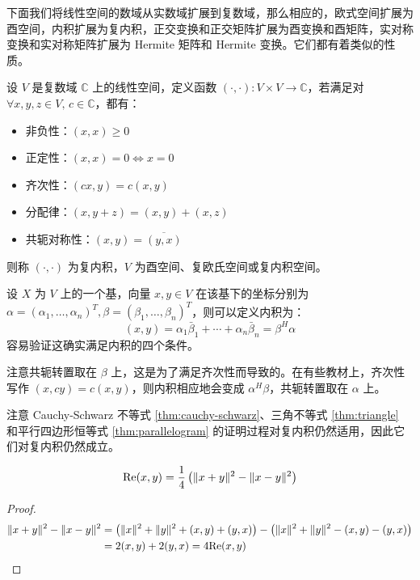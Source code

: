 下面我们将线性空间的数域从实数域扩展到复数域，那么相应的，欧式空间扩展为酉空间，内积扩展为复内积，正交变换和正交矩阵扩展为酉变换和酉矩阵，实对称变换和实对称矩阵扩展为 Hermite 矩阵和 Hermite 变换。它们都有着类似的性质。

\begin{definition}
设 $V$ 是复数域 $\mathbb C$ 上的线性空间，定义函数 $(\cdot,\cdot):V\times V\to \mathbb C$，若满足对 $\forall x,y,z\in V,\,c\in\mathbb C$，都有：
\begin{itemize}
    \item 非负性：$(x,x)\geq 0$
    \item 正定性：$(x,x)=0\iff x=0$
    \item 齐次性：$(cx,y)=c(x,y)$
    \item 分配律：$(x,y+z)=(x,y)+(x,z)$
    \item 共轭对称性：$(x,y)=\overline{(y,x)}$
\end{itemize}
则称 $(\cdot,\cdot)$ 为复内积，$V$ 为酉空间、复欧氏空间或复内积空间。
\end{definition}

\begin{example}[根据坐标定义复内积]
设 $X$ 为 $V$ 上的一个基，向量 $x,y\in V$ 在该基下的坐标分别为 $\alpha=(\alpha_1,\ldots,\alpha_n)^T,\beta=(\beta_1,\ldots,\beta_n)^T$，则可以定义内积为：
\[
    (x,y)=\alpha_1\bar\beta_1+\cdots+\alpha_n\bar\beta_n=\beta^H\alpha
\]
容易验证这确实满足内积的四个条件。
\end{example}
\begin{note}
注意共轭转置取在 $\beta$ 上，这是为了满足齐次性而导致的。在有些教材上，齐次性写作 $(x,cy)=c(x,y)$，则内积相应地会变成 $\alpha^H\beta$，共轭转置取在 $\alpha$ 上。
\end{note}

注意 Cauchy-Schwarz 不等式 \ref{thm:cauchy-schwarz}、三角不等式 \ref{thm:triangle} 和平行四边形恒等式 \ref{thm:parallelogram} 的证明过程对复内积仍然适用，因此它们对复内积仍然成立。

\begin{theorem}[极化恒等式]
\label{thm:polirization}
\[
    \text{Re}(x,y)=\frac{1}{4}\left(\Vert x+y\Vert^2-\Vert x-y\Vert^2\right)
\]
\end{theorem}
\begin{proof}
\begin{align*}
    \Vert x+y\Vert^2-\Vert x-y\Vert^2&=\big(\Vert x\Vert^2+\Vert y\Vert^2+(x,y)+(y,x)\big)-\big(\Vert x\Vert^2+\Vert y\Vert^2-(x,y)-(y,x)\big)\\
    &=2(x,y)+2(y,x)=4\text{Re}(x,y)
\end{align*}
\end{proof}

